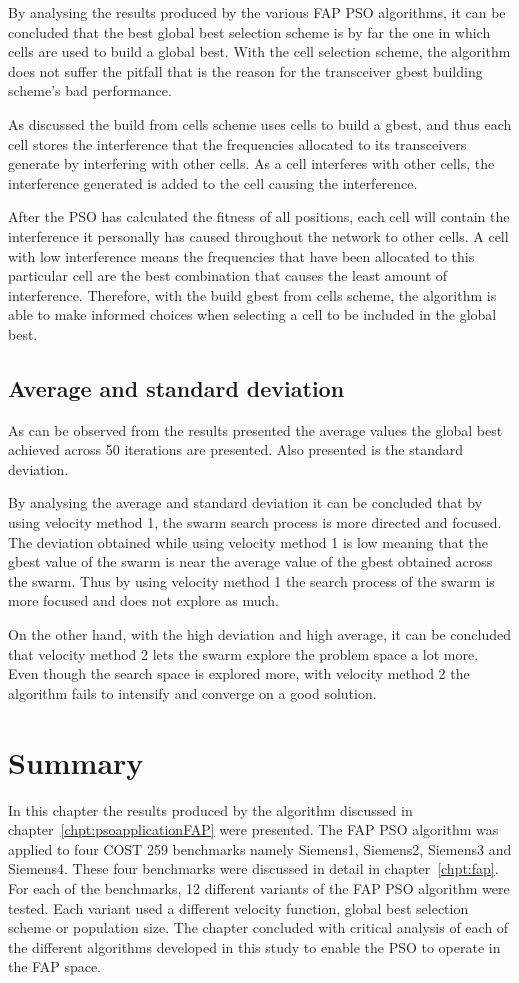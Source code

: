 By analysing the results produced by the various FAP PSO algorithms, it can be concluded that the best global best selection scheme is by far the one in which cells are used to build a global best. With the cell selection scheme, the algorithm does not suffer the pitfall that is the reason for the transceiver gbest building scheme's bad performance.

As discussed the build from cells scheme uses cells to build a gbest, and thus each cell stores the interference that the frequencies allocated to its transceivers generate by interfering with other cells. As a cell interferes with other cells, the interference generated is added to the cell causing the interference.

After the PSO has calculated the fitness of all positions, each cell will contain the interference it personally has caused throughout the network to other cells. A cell with low interference means the frequencies that have been allocated to this particular cell are the best combination that causes the least amount of interference. Therefore, with the build gbest from cells scheme, the algorithm is able to make informed choices when selecting a cell to be included in the global best. 
\subsection{Average and standard deviation}
As can be observed from the results presented the average values the global best achieved across 50 iterations are presented. Also presented is the standard deviation.

By analysing the average and standard deviation it can be concluded that by using velocity method 1, the swarm search process is more directed and focused. The deviation obtained while using velocity method 1 is low meaning that the gbest value of the swarm is near the average value of the gbest obtained across the swarm. Thus by using velocity method 1 the search process of the swarm is more focused and does not explore as much.

On the other hand, with the high deviation and high average, it can be concluded that velocity method 2 lets the swarm explore the problem space a lot more. Even though the search space is explored more, with velocity method 2 the algorithm fails to intensify and converge on a good solution.

\section{Summary}
In this chapter the results produced by the algorithm discussed in chapter~\ref{chpt:psoapplicationFAP} were presented. The FAP PSO algorithm was applied to four COST 259 benchmarks namely Siemens1, Siemens2, Siemens3 and Siemens4. These four benchmarks were discussed in detail in chapter~\ref{chpt:fap}. For each of the benchmarks, 12 different variants of the FAP PSO algorithm were tested. Each variant used a different velocity function, global best selection scheme or population size. The chapter concluded with critical analysis of each of the different algorithms developed in this study to enable the PSO to operate in the FAP space.
